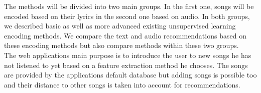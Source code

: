 The methods will be divided into two main groups. In the first one, songs will be encoded based on their lyrics in the second one based on audio. In both groups, we described basic as well as more advanced existing unsupervised learning encoding methods. We compare the text and audio recommendations based on these encoding methods but also compare methods within these two groups. \\
The web applications main purpose is to introduce the user to new songs he has not listened to yet based on a feature extraction method he chooses. The songs are provided by the applications default database but adding songs is possible too and their distance to other songs is taken into account for recommendations. \\